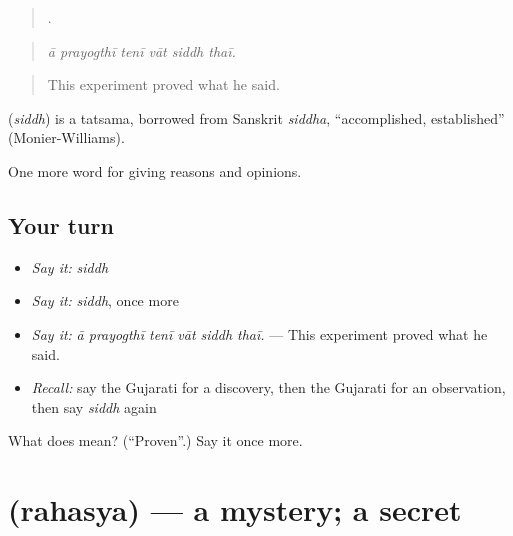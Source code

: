 \begin{quote}
     .
\end{quote}

\begin{quote}
\emph{ā prayogthī tenī vāt siddh thaī.}
\end{quote}

\begin{quote}
This experiment proved what he said.
\end{quote}

\begin{cousinweb}
\textbf{} (\emph{siddh}) is a tatsama, borrowed from Sanskrit \emph{siddha}, \textquotedblleft{}accomplished, established\textquotedblright{} (Monier-Williams).
\end{cousinweb}

\begin{grammarlens}[title={What you've built}]
One more word for giving reasons and opinions.
\end{grammarlens}

\subsection*{Your turn}
\begin{itemize}
\raggedright
  \item \emph{Say it:} \emph{siddh}
  \item \emph{Say it:} \emph{siddh}, once more
  \item \emph{Say it:} \emph{ā prayogthī tenī vāt siddh thaī.} — This experiment proved what he said.
  \item \emph{Recall:} say the Gujarati for a discovery, then the Gujarati for an observation, then say \emph{siddh} again
\end{itemize}

\begin{tcolorbox}[breakable,colback=teal!4,colframe=teal!35!black,title={Before you move on}]
What does  mean? (\textquotedblleft{}Proven\textquotedblright{}.) Say it once more.
\end{tcolorbox}
\section[\texorpdfstring{\gu{રહસ્ય} (rahasya)}{રહસ્ય (rahasya)}]{ (rahasya) — a mystery; a secret}

\label{lesson:GU-C364-rahasya}



